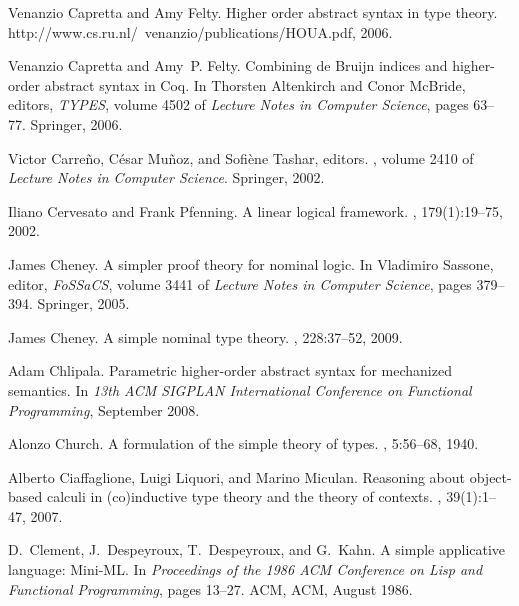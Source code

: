 \documentclass[final]{svjour3}
\begin{document}
\begin{thebibliography}{100}
Venanzio Capretta and Amy Felty.
\newblock Higher order abstract syntax in type theory.
\newblock http://www.cs.ru.nl/~venanzio/publications/HOUA.pdf, 2006.

Venanzio Capretta and Amy~P. Felty.
\newblock Combining de {B}ruijn indices and higher-order abstract syntax in
  {C}oq.
\newblock In Thorsten Altenkirch and Conor McBride, editors, {\em TYPES},
  volume 4502 of {\em Lecture Notes in Computer Science}, pages 63--77.
  Springer, 2006.

Victor Carre{\~n}o, C{\'e}sar Mu{\~n}oz, and Sofi{\`e}ne Tashar, editors.
, volume 2410 of {\em Lecture Notes in Computer Science}.
  Springer, 2002.

Iliano Cervesato and Frank Pfenning.
\newblock A linear logical framework.
, 179(1):19--75, 2002.

James Cheney.
\newblock A simpler proof theory for nominal logic.
\newblock In Vladimiro Sassone, editor, {\em FoSSaCS}, volume 3441 of {\em
  Lecture Notes in Computer Science}, pages 379--394. Springer, 2005.

James Cheney.
\newblock A simple nominal type theory.
, 228:37--52, 2009.

Adam Chlipala.
\newblock Parametric higher-order abstract syntax for mechanized semantics.
\newblock In {\em 13th ACM SIGPLAN International Conference on Functional
  Programming}, September 2008.

Alonzo Church.
\newblock A formulation of the simple theory of types.
, 5:56--68, 1940.

Alberto Ciaffaglione, Luigi Liquori, and Marino Miculan.
\newblock Reasoning about object-based calculi in (co)inductive type theory and
  the theory of contexts.
, 39(1):1--47, 2007.

D.~Clement, J.~Despeyroux, T.~Despeyroux, and G.~Kahn.
\newblock A simple applicative language: Mini-{ML}.
\newblock In {\em Proceedings of the 1986 {ACM} Conference on Lisp and
  Functional Programming}, pages 13--27. ACM, ACM, August 1986.


\end{thebibliography}
\end{document}
